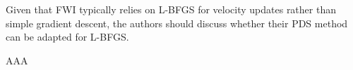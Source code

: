 \begin{point}
	Given that FWI typically relies on L-BFGS for velocity updates rather than simple gradient descent, the authors should discuss whether their PDS method can be adapted for L-BFGS.
\end{point}

\begin{reply}
	AAA
\end{reply}

